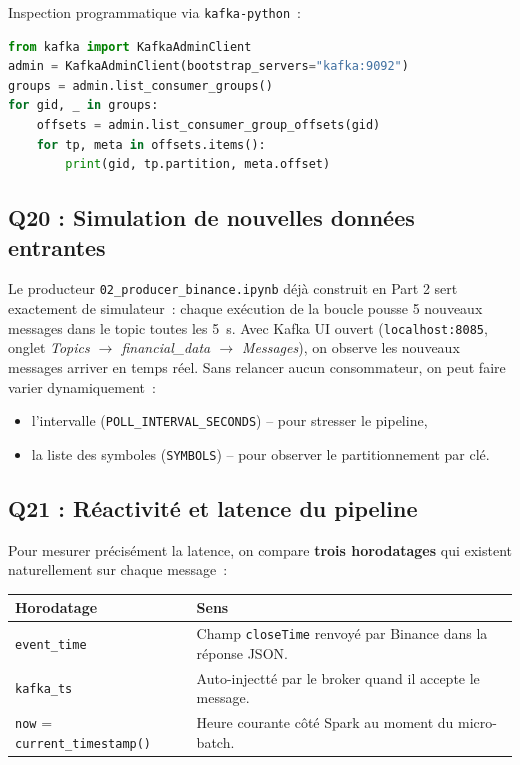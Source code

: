 \documentclass{RapportINPTCLOUD}
\begin{document}
Inspection programmatique via \texttt{kafka-python}~:
\begin{lstlisting}[style=code, language=Python, caption=Lister les groupes et leurs offsets]
from kafka import KafkaAdminClient
admin = KafkaAdminClient(bootstrap_servers="kafka:9092")
groups = admin.list_consumer_groups()
for gid, _ in groups:
    offsets = admin.list_consumer_group_offsets(gid)
    for tp, meta in offsets.items():
        print(gid, tp.partition, meta.offset)
\end{lstlisting}

\subsection{Q20 : Simulation de nouvelles donn\'{e}es entrantes}

Le producteur \texttt{02\_producer\_binance.ipynb} d\'{e}j\`{a} construit en Part 2 sert exactement de simulateur~: chaque ex\'{e}cution de la boucle pousse 5 nouveaux messages dans le topic toutes les 5~s. Avec Kafka UI ouvert (\texttt{localhost:8085}, onglet \textit{Topics $\rightarrow$ financial\_data $\rightarrow$ Messages}), on observe les nouveaux messages arriver en temps r\'{e}el. Sans relancer aucun consommateur, on peut faire varier dynamiquement~:
\begin{itemize}[leftmargin=2em]
    \item l'intervalle (\texttt{POLL\_INTERVAL\_SECONDS}) -- pour stresser le pipeline,
    \item la liste des symboles (\texttt{SYMBOLS}) -- pour observer le partitionnement par cl\'{e}.
\end{itemize}

\subsection{Q21 : R\'{e}activit\'{e} et latence du pipeline}

Pour mesurer pr\'{e}cis\'{e}ment la latence, on compare \textbf{trois horodatages} qui existent naturellement sur chaque message~:

\begin{center}
\begin{tabular}{|l|p{8.3cm}|}
\hline
\textbf{Horodatage} & \textbf{Sens} \\
\hline
\texttt{event\_time} & Champ \texttt{closeTime} renvoy\'{e} par Binance dans la r\'{e}ponse JSON. \\
\texttt{kafka\_ts} & Auto-injectt\'{e} par le broker quand il accepte le message. \\
\texttt{now} = \texttt{current\_timestamp()} & Heure courante c\^{o}t\'{e} Spark au moment du micro-batch. \\
\hline
\end{tabular}
\end{center}
\end{document}
